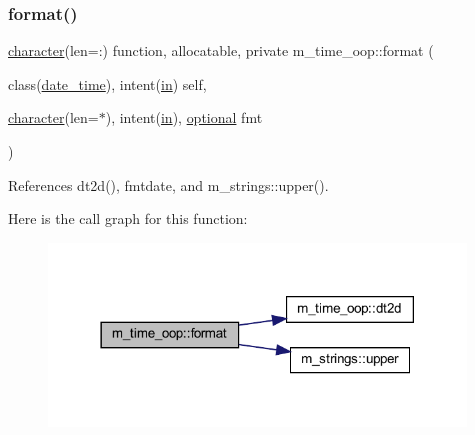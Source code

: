 \subsubsection{\texorpdfstring{format()}{format()}}
{\footnotesize\ttfamily \hyperlink{option__stopwatch_83_8txt_abd4b21fbbd175834027b5224bfe97e66}{character}(len=\+:) function, allocatable, private m\+\_\+time\+\_\+oop\+::format (\begin{DoxyParamCaption}\item[{class(\hyperlink{structm__time__oop_1_1date__time}{date\+\_\+time}), intent(\hyperlink{M__journal_83_8txt_afce72651d1eed785a2132bee863b2f38}{in})}]{self,  }\item[{\hyperlink{option__stopwatch_83_8txt_abd4b21fbbd175834027b5224bfe97e66}{character}(len=$\ast$), intent(\hyperlink{M__journal_83_8txt_afce72651d1eed785a2132bee863b2f38}{in}), \hyperlink{option__stopwatch_83_8txt_aa4ece75e7acf58a4843f70fe18c3ade5}{optional}}]{fmt }\end{DoxyParamCaption})\hspace{0.3cm}{\ttfamily [private]}}



References dt2d(), fmtdate, and m\+\_\+strings\+::upper().

Here is the call graph for this function\+:
\nopagebreak
\begin{figure}[H]
\begin{center}
\leavevmode
\includegraphics[width=314pt]{namespacem__time__oop_a78bb598e3481faa48df9733a3f9ae060_cgraph}
\end{center}
\end{figure}
\mbox{\label{namespacem__time__oop_aeea1131ab511b897168f00a908b75458}} 
